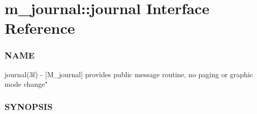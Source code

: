\hypertarget{interfacem__journal_1_1journal}{}\section{m\+\_\+journal\+:\+:journal Interface Reference}
\label{interfacem__journal_1_1journal}


\subsubsection*{N\+A\+ME}

journal(3f) -\/ \mbox{[}M\+\_\+journal\mbox{]} provides public message routine, no paging or graphic mode change" \subsubsection*{S\+Y\+N\+O\+P\+S\+IS} 


